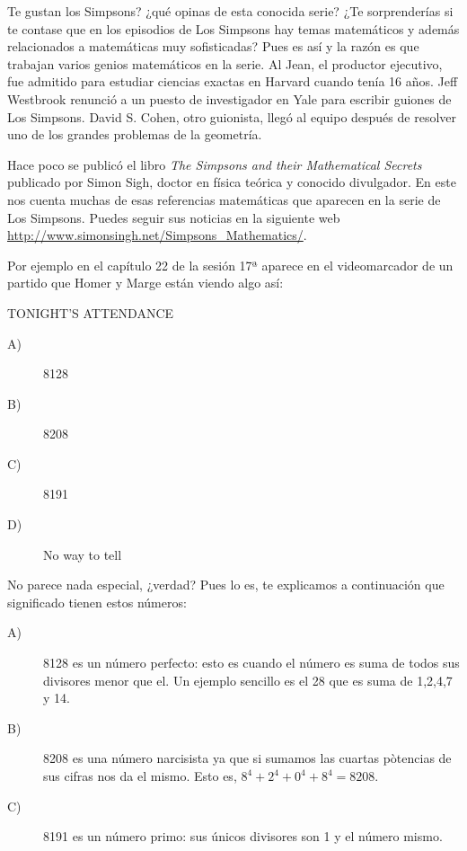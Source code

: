 \usetikzlibrary{trees}


\newcommand{\cara}{\fontsize{10}{6}\selectfont\color{redsol} \ManFace}
\begin{multicols}{2}

\cappar Te gustan los Simpsons? ¿qué opinas de esta conocida serie? ¿Te sorprenderías si te contase que en los episodios de Los Simpsons hay temas matemáticos y además relacionados a matemáticas muy sofisticadas? Pues es así y la razón es que trabajan varios genios matemáticos en la serie. Al Jean, el productor ejecutivo, fue admitido para estudiar ciencias exactas en Harvard cuando tenía 16 años. Jeff Westbrook renunció a un puesto de investigador en Yale para escribir guiones de Los Simpsons. David S. Cohen, otro guionista, llegó al equipo después de resolver uno de los grandes problemas de la geometría. 

Hace poco se publicó el libro \emph{The Simpsons and their Mathematical Secrets} publicado por Simon Sigh, doctor en física teórica y conocido divulgador. En este nos cuenta muchas de  esas referencias matemáticas que aparecen en la serie de Los Simpsons. Puedes seguir sus noticias en la siguiente web \url{http://www.simonsingh.net/Simpsons_Mathematics/}.

Por ejemplo en el capítulo 22 de la sesión 17ª aparece en el videomarcador de un partido que Homer y Marge están viendo algo así:

\begin{mybox}
\huge{TONIGHT'S ATTENDANCE}
\begin{description}
\item[A)] 8128
\item[B)] 8208
\item[C)] 8191
\item[D)] No way to tell
\end{description}
\end{mybox}

No parece nada especial, ¿verdad? Pues lo es, te explicamos a continuación que significado tienen estos números:
\begin{description}
\item[A)] 8128 es un número perfecto: esto es cuando el número es suma de todos sus divisores menor que el. Un ejemplo sencillo es el 28 que es suma de 1,2,4,7 y 14. 
\item[B)] 8208 es una número narcisista ya que si sumamos las cuartas pòtencias de sus cifras nos da el mismo. Esto es, $8^4+2^4+0^4+8^4=8208$.
\item[C)] 8191 es un número primo: sus únicos divisores son 1 y el número mismo.
\end{description}


\end{multicols}
